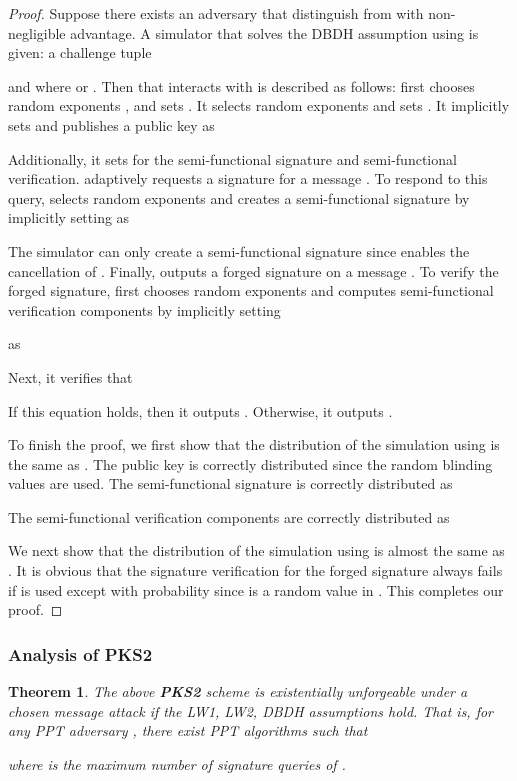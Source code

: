 \documentclass[11pt,letterpaper]{article}
\newcommand{\vs}{\vspace{1.5mm}}
\newtheorem{theorem}{Theorem}[section]
\newcommand{\tb}[1]{\textbf{#1}}
\begin{document}
\begin{proof}
Suppose there exists an adversary  that distinguish  from
 with non-negligible advantage. A simulator  that solves
the DBDH assumption using  is given: a challenge tuple
    
    and  where  or .
Then  that interacts with  is described as follows:
 first chooses random exponents ,  and sets . It selects random
exponents  and sets
    .
It implicitly sets  and publishes a public key  as
    
Additionally, it sets  for the semi-functional
signature and semi-functional verification.  adaptively requests a
signature for a message . To respond to this query,  selects
random exponents  and creates a
semi-functional signature by implicitly setting  as
    
The simulator can only create a semi-functional signature since 
enables the cancellation of . Finally,  outputs a forged
signature  on a message . To
verify the forged signature,  first chooses random exponents  and computes semi-functional verification
components by implicitly setting
    
as
    
Next, it verifies that
    
If this equation holds, then it outputs . Otherwise, it outputs .

\vs To finish the proof, we first show that the distribution of the
simulation using  is the same as . The
public key is correctly distributed since the random blinding values  are used. The semi-functional signature is correctly distributed as
    
The semi-functional verification components are correctly distributed as
    
We next show that the distribution of the simulation using  is almost the same as . It is obvious that the
signature verification for the forged signature always fails if  is used except with  probability since  is a random value
in .
This completes our proof.
\end{proof}

\subsubsection{Analysis of PKS2}

\begin{theorem} \label{thm:pks2-prime}
The above \tb{PKS2} scheme is existentially unforgeable under a chosen
message attack if the LW1, LW2, DBDH assumptions hold. That is, for any PPT
adversary , there exist PPT algorithms 
such that
    
where  is the maximum number of signature queries of .
\end{theorem}
\end{document}
